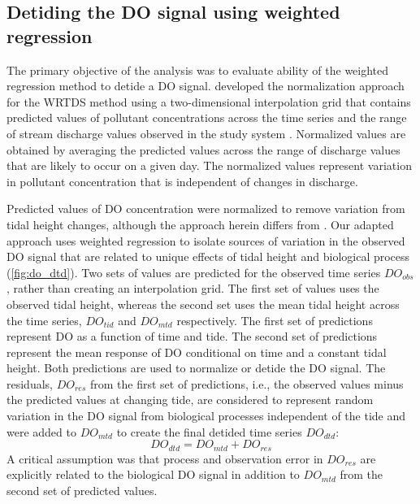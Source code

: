 \subsection{Detiding the \ac{DO} signal using weighted regression}

The primary objective of the analysis was to evaluate ability of the weighted regression method to detide a \ac{DO} signal.  \citet{Hirsch10} developed the normalization approach for the \ac{WRTDS} method using a two-dimensional interpolation grid that contains predicted values of pollutant concentrations across the time series and the range of stream discharge values observed in the study system \citep{Hirsch10}.  Normalized values are obtained by averaging the predicted values across the range of discharge values that are likely to occur on a given day.  The normalized values represent variation in pollutant concentration that is independent of changes in discharge.  

Predicted values of \ac{DO} concentration were normalized to remove variation from tidal height changes, although the approach herein differs from \citet{Hirsch10}.  Our adapted approach uses weighted regression to isolate sources of variation in the observed \ac{DO} signal that are related to unique effects of tidal height and biological process (\cref{fig:do_dtd}).  Two sets of values are predicted for the observed time series $DO_{obs}$, rather than creating an interpolation grid.  The first set of values uses the observed tidal height, whereas the second set uses the mean tidal height across the time series, $DO_{tid}$ and $DO_{mtd}$ respectively.  The first set of predictions represent \ac{DO} as a function of time and tide.  The second set of predictions represent the mean response of \ac{DO} conditional on time and a constant tidal height.  Both predictions are used to normalize or detide the \ac{DO} signal.  The residuals, $DO_{res}$ from the first set of predictions, i.e., the observed values minus the predicted values at changing tide, are considered to represent random variation in the \ac{DO} signal from biological processes independent of the tide and were added to $DO_{mtd}$ to create the final detided time series $DO_{dtd}$:
\begin{equation}
DO_{dtd} = DO_{mtd} + DO_{res}
\end{equation}
A critical assumption was that process and observation error in $DO_{res}$ are explicitly related to the biological \ac{DO} signal in addition to $DO_{mtd}$ from the second set of predicted values. 
